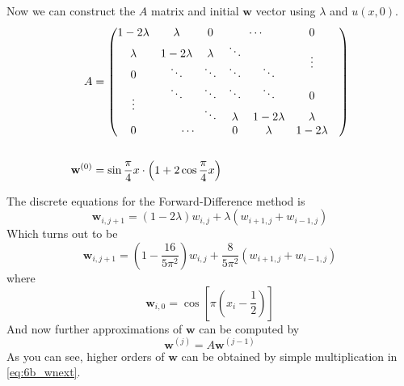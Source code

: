 \documentclass[12pt]{article}
\begin{document}
Now we can construct the $A$ matrix and initial $\mathbf{w}$ vector using $\lambda$ and $u(x,0)$.
\begin{equation}
  \label{eq:6b_A}
  \begin{aligned}
    A &=
    \begin{pmatrix}
      1-2\lambda & \lambda    & 0       & \multicolumn{2}{c}{\cdots} & 0 \\
      \lambda    & 1-2\lambda & \lambda & \ddots &  & \multirow{2}{*}{\vdots} \\
      0 & \ddots & \ddots & \ddots & \ddots & & \\
      \multirow{2}{*}{\vdots} & \ddots & \ddots & \ddots & \ddots & 0 \\
      & & \ddots & \lambda & 1-2\lambda & \lambda \\
      0 & \multicolumn{2}{c}{\cdots} & 0 & \lambda & 1-2\lambda \\
    \end{pmatrix} \\
    \\
    \mathbf{w}^{(0)} &= \sin\frac{\pi}{4}x \cdot
    \left(1+2\cos\frac{\pi}{4}x\right)\\
  \end{aligned}
\end{equation}

The discrete equations for the Forward-Difference method is
\begin{equation}
  \label{eq:6b_discrete}
  \mathbf{w}_{i,j+1}=(1-2\lambda)w_{i,j}+\lambda(w_{i+1,j}+w_{i-1,j})
\end{equation}
Which turns out to be 
\begin{equation}
  \label{eq:6b_discrete_val}
  \mathbf{w}_{i,j+1}=\left(1-\frac{16}{5\pi^2}\right)w_{i,j}+\frac{8}{5\pi^2}(w_{i+1,j}+w_{i-1,j})
\end{equation}
where 
\begin{equation}
  \label{eq:6b_w_i_0}
  \mathbf{w}_{i,0} = \cos\left[\pi\left(x_i-\frac{1}{2}\right)\right]
\end{equation}
And now further approximations of $\mathbf{w}$ can be computed by
\begin{equation}
  \label{eq:6b_wnext}
  \mathbf{w}^{(j)} = A\mathbf{w}^{(j-1)}
\end{equation}
As you can see, higher orders of $\mathbf{w}$ can be obtained by
simple multiplication in \cref{eq:6b_wnext}.
\end{document}
